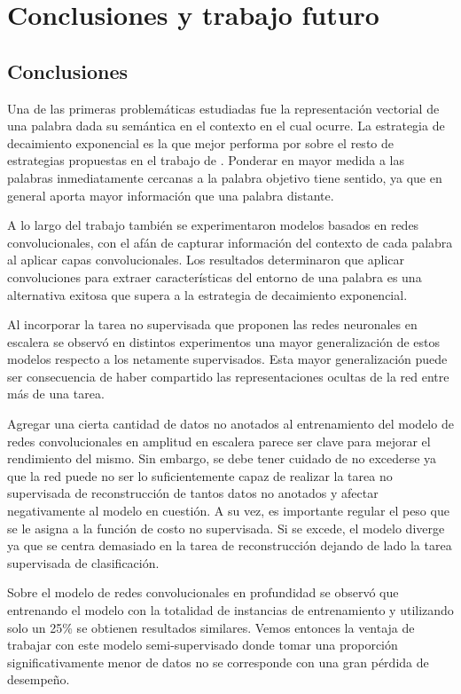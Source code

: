\chapter{Conclusiones y trabajo futuro} \label{chapter:chapter5}

\section{Conclusiones}

Una de las primeras problemáticas estudiadas fue la representación vectorial de una palabra dada su semántica en el contexto en el cual ocurre. La estrategia de decaimiento exponencial es la que mejor performa por sobre el resto de estrategias propuestas en el trabajo de \cite{iacobacci-etal-2016-embeddings}. Ponderar en mayor medida a las palabras inmediatamente cercanas a la palabra objetivo tiene sentido, ya que en general aporta mayor información que una palabra distante.

A lo largo del trabajo también se experimentaron modelos basados en redes convolucionales, con el afán de capturar información del contexto de cada palabra al aplicar capas convolucionales. Los resultados determinaron que aplicar convoluciones para extraer características del entorno de una palabra es una alternativa exitosa que supera a la estrategia de decaimiento exponencial.

Al incorporar la tarea no supervisada que proponen las redes neuronales en escalera se observó en distintos experimentos una mayor generalización de estos modelos respecto a los netamente supervisados. Esta mayor generalización puede ser consecuencia de haber compartido las representaciones ocultas de la red entre más de una tarea. 

Agregar una cierta cantidad de datos no anotados al entrenamiento del modelo de redes convolucionales en amplitud en escalera parece ser clave para mejorar el rendimiento del mismo. Sin embargo, se debe tener cuidado de no excederse ya que la red puede no ser lo suficientemente capaz de realizar la tarea no supervisada de reconstrucción de tantos datos no anotados y afectar negativamente al modelo en cuestión. A su vez, es importante regular el peso que se le asigna a la función de costo no supervisada. Si se excede, el modelo diverge ya que se centra demasiado en la tarea de reconstrucción dejando de lado la tarea supervisada de clasificación.

Sobre el modelo de redes convolucionales en profundidad se observó que entrenando el modelo con la totalidad de instancias de entrenamiento y utilizando solo un 25\% se obtienen resultados similares. Vemos entonces la ventaja de trabajar con este modelo semi-supervisado donde tomar una proporción significativamente menor de datos no se corresponde con una gran pérdida de desempeño.

